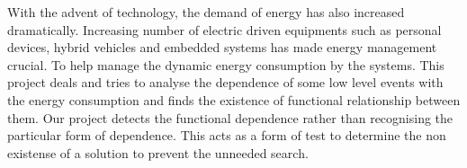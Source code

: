 With the advent of technology, the demand of energy has also increased dramatically. Increasing number of electric driven equipments such as personal devices, hybrid vehicles and embedded systems has made energy management crucial. To help manage the dynamic energy consumption by the systems. This project deals and tries to analyse the dependence of some low level events with the energy consumption and finds the existence of functional relationship between them. Our project detects the functional dependence rather than recognising the particular form of dependence. This acts as a form of test to determine the non existense of a solution to prevent the unneeded search.